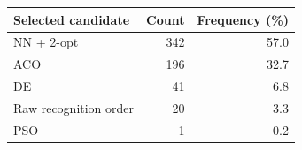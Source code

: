 \begin{tabular}{lrr}
\toprule
Selected candidate & Count & Frequency (\%) \\
\midrule
NN + 2-opt & 342 & 57.0 \\ 
ACO & 196 & 32.7 \\ 
DE & 41 & 6.8 \\ 
Raw recognition order & 20 & 3.3 \\ 
PSO & 1 & 0.2 \\ 
\bottomrule
\end{tabular}
